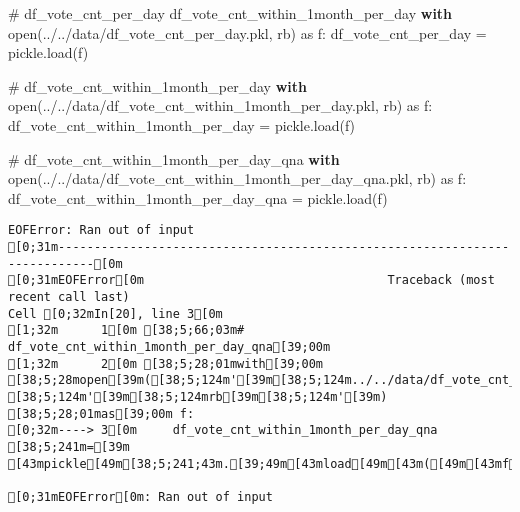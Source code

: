 \documentclass[
  letterpaper,
  DIV=11,
  numbers=noendperiod]{scrartcl}
\newenvironment{Shaded}{\begin{snugshade}}{\end{snugshade}}
\newcommand{\BuiltInTok}[1]{\textcolor[rgb]{0.00,0.23,0.31}{#1}}
\newcommand{\CommentTok}[1]{\textcolor[rgb]{0.37,0.37,0.37}{#1}}
\newcommand{\ControlFlowTok}[1]{\textcolor[rgb]{0.00,0.23,0.31}{\textbf{#1}}}
\newcommand{\ImportTok}[1]{\textcolor[rgb]{0.00,0.46,0.62}{#1}}
\newcommand{\NormalTok}[1]{\textcolor[rgb]{0.00,0.23,0.31}{#1}}
\newcommand{\OperatorTok}[1]{\textcolor[rgb]{0.37,0.37,0.37}{#1}}
\newcommand{\StringTok}[1]{\textcolor[rgb]{0.13,0.47,0.30}{#1}}
\begin{document}
\begin{Shaded}
\begin{Highlighting}[]
\CommentTok{\# df\_vote\_cnt\_per\_day df\_vote\_cnt\_within\_1month\_per\_day}
\ControlFlowTok{with} \BuiltInTok{open}\NormalTok{(}\StringTok{\textquotesingle{}../../data/df\_vote\_cnt\_per\_day.pkl\textquotesingle{}}\NormalTok{, }\StringTok{\textquotesingle{}rb\textquotesingle{}}\NormalTok{) }\ImportTok{as}\NormalTok{ f:}
\NormalTok{    df\_vote\_cnt\_per\_day }\OperatorTok{=}\NormalTok{ pickle.load(f)}
\end{Highlighting}
\end{Shaded}

\begin{Shaded}
\begin{Highlighting}[]
\CommentTok{\# df\_vote\_cnt\_within\_1month\_per\_day}
\ControlFlowTok{with} \BuiltInTok{open}\NormalTok{(}\StringTok{\textquotesingle{}../../data/df\_vote\_cnt\_within\_1month\_per\_day.pkl\textquotesingle{}}\NormalTok{, }\StringTok{\textquotesingle{}rb\textquotesingle{}}\NormalTok{) }\ImportTok{as}\NormalTok{ f:}
\NormalTok{    df\_vote\_cnt\_within\_1month\_per\_day }\OperatorTok{=}\NormalTok{ pickle.load(f)}
\end{Highlighting}
\end{Shaded}

\begin{Shaded}
\begin{Highlighting}[]
\CommentTok{\# df\_vote\_cnt\_within\_1month\_per\_day\_qna}
\ControlFlowTok{with} \BuiltInTok{open}\NormalTok{(}\StringTok{\textquotesingle{}../../data/df\_vote\_cnt\_within\_1month\_per\_day\_qna.pkl\textquotesingle{}}\NormalTok{, }\StringTok{\textquotesingle{}rb\textquotesingle{}}\NormalTok{) }\ImportTok{as}\NormalTok{ f:}
\NormalTok{    df\_vote\_cnt\_within\_1month\_per\_day\_qna }\OperatorTok{=}\NormalTok{ pickle.load(f)}
\end{Highlighting}
\end{Shaded}

\begin{verbatim}
EOFError: Ran out of input
[0;31m---------------------------------------------------------------------------[0m
[0;31mEOFError[0m                                  Traceback (most recent call last)
Cell [0;32mIn[20], line 3[0m
[1;32m      1[0m [38;5;66;03m# df_vote_cnt_within_1month_per_day_qna[39;00m
[1;32m      2[0m [38;5;28;01mwith[39;00m [38;5;28mopen[39m([38;5;124m'[39m[38;5;124m../../data/df_vote_cnt_within_1month_per_day_qna.pkl[39m[38;5;124m'[39m, [38;5;124m'[39m[38;5;124mrb[39m[38;5;124m'[39m) [38;5;28;01mas[39;00m f:
[0;32m----> 3[0m     df_vote_cnt_within_1month_per_day_qna [38;5;241m=[39m [43mpickle[49m[38;5;241;43m.[39;49m[43mload[49m[43m([49m[43mf[49m[43m)[49m

[0;31mEOFError[0m: Ran out of input
\end{verbatim}
\end{document}
